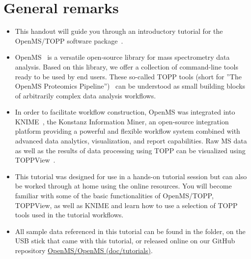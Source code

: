 \documentclass[12pt]{myNotes}
\begin{document}

\firstpages


\setcounter{equation}{0}
\section{General remarks}
\label{General remarks}

\begin{itemize}
\item This handout will guide you through an introductory tutorial for the OpenMS/TOPP software package~\cite{OpenMS}.
\item OpenMS~\cite{Sturm2008,rost2016openms} is a versatile open-source library for mass spectrometry data analysis. Based on this
	library, we offer a collection of command-line tools ready to be used by end users. These so-called TOPP tools (short for ''The OpenMS Proteomics Pipeline'')~\cite{Kohlbacher2007} can be understood as small building blocks of arbitrarily complex data analysis workflows.
\item In order to facilitate workflow construction, OpenMS was integrated into \newline
	KNIME~\cite{KNIME}, the Konstanz
	Information Miner, an open-source integration platform providing a powerful and flexible workflow system
	combined with \newline advanced data analytics, visualization, and report capabilities. Raw MS data as well as the
	results of data processing using TOPP can be visualized using TOPPView~\cite{Sturm2009}.
\item This tutorial was designed for use in a hands-on tutorial session but can also be worked through at home using the online 
	resources. You will become familiar with some of the basic functionalities of OpenMS/TOPP, TOPPView, as well as KNIME
	and learn how to use a selection of TOPP tools used in the tutorial workflows.
\item All sample data referenced in this tutorial can be found in the \newline
	\directory{\ExampleDataFolder} folder, on the USB stick that came with this tutorial, or released online on our GitHub repository
	\hyperlink{https://github.com/OpenMS/OpenMS/tree/develop/doc/tutorials}{OpenMS/OpenMS (doc/tutorials)}.
\end{itemize}
\end{document}

